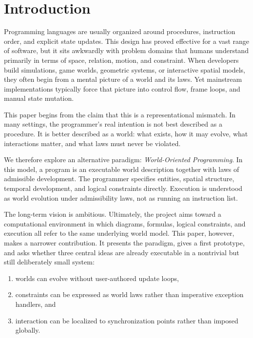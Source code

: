 \documentclass[sigplan,review,anonymous]{acmart}
\begin{document}


\maketitle

\section{Introduction}

Programming languages are usually organized around procedures, instruction order, and explicit state updates.
This design has proved effective for a vast range of software, but it sits awkwardly with problem domains that humans understand primarily in terms of space, relation, motion, and constraint.
When developers build simulations, game worlds, geometric systems, or interactive spatial models, they often begin from a mental picture of a world and its laws.
Yet mainstream implementations typically force that picture into control flow, frame loops, and manual state mutation.

This paper begins from the claim that this is a representational mismatch.
In many settings, the programmer's real intention is not best described as a procedure.
It is better described as a world: what exists, how it may evolve, what interactions matter, and what laws must never be violated.

We therefore explore an alternative paradigm: \emph{World-Oriented Programming}.
In this model, a program is an executable world description together with laws of admissible development.
The programmer specifies entities, spatial structure, temporal development, and logical constraints directly.
Execution is understood as world evolution under admissibility laws, not as running an instruction list.

The long-term vision is ambitious.
Ultimately, the project aims toward a computational environment in which diagrams, formulas, logical constraints, and execution all refer to the same underlying world model.
This paper, however, makes a narrower contribution.
It presents the paradigm, gives a first prototype, and asks whether three central ideas are already executable in a nontrivial but still deliberately small system:
\begin{enumerate}
\item worlds can evolve without user-authored update loops,
\item constraints can be expressed as world laws rather than imperative exception handlers, and
\item interaction can be localized to synchronization points rather than imposed globally.
\end{enumerate}
\end{document}
